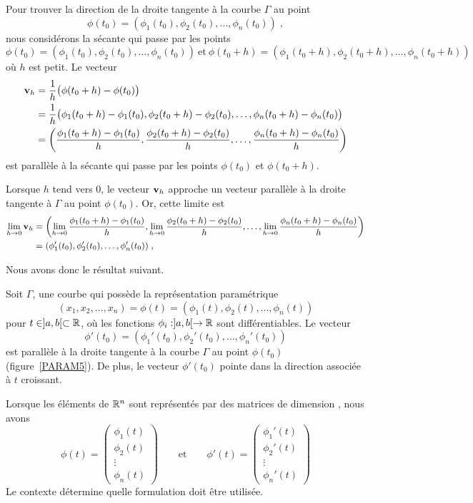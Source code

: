 {Pour trouver la direction de la droite tangente à la courbe $\Gamma$
au point
\[
\phi(t_0) = (\phi_1(t_0), \phi_2(t_0), \ldots, \phi_n(t_0)) \; ,
\]
nous considérons la sécante qui passe par les points
\[
\phi(t_0) = (\phi_1(t_0), \phi_2(t_0), \ldots, \phi_n(t_0))
\ \text{et} \ 
\phi(t_0+h) = (\phi_1(t_0+h), \phi_2(t_0+h), \ldots, \phi_n(t_0+h))
\]
où $h$ est petit. Le vecteur
\begin{align*}
\mathbf{v}_h &= \frac{1}{h} \big(\phi(t_0+h)-\phi(t_0)\big) \\
&= \frac{1}{h}\big(\phi_1(t_0+h) - \phi_1(t_0),
\phi_2(t_0+h) - \phi_2(t_0), \ldots , \phi_n(t_0+h)-\phi_n(t_0)\big) \\
&= \left(\displaystyle \frac{\phi_1(t_0+h) - \phi_1(t_0)}{h},
\displaystyle \frac{\phi_2(t_0+h) - \phi_2(t_0)}{h}, \ldots ,
\displaystyle \frac{\phi_n(t_0+h) - \phi_n(t_0)}{h}\right)
\end{align*}
est parallèle à la sécante qui passe par les points $\phi(t_0)$ et
$\phi(t_0+h)$.

Lorsque $h$ tend vers $0$, le vecteur $\mathbf{v}_h$ approche un vecteur
parallèle à la droite tangente à $\Gamma$ au point $\phi(t_0)$.  Or,
cette limite est
\begin{align*}
\lim_{h\rightarrow 0}\mathbf{v}_h &=
\left(\displaystyle \lim_{h\rightarrow 0}\frac{\phi_1(t_0+h) - \phi_1(t_0)}{h},
\displaystyle \lim_{h\rightarrow 0}\frac{\phi_2(t_0+h) - \phi_2(t_0)}{h},
 \ldots ,
\displaystyle \lim_{h\rightarrow 0}\frac{\phi_n(t_0+h)
- \phi_n(t_0)}{h}\right) \\
&= (\phi_1'(t_0), \phi_2'(t_0), \ldots, \phi_n'(t_0)) \; ,
\end{align*}

Nous avons donc le résultat suivant.

\begin{prop}
Soit $\Gamma$, une courbe qui possède la représentation paramétrique
\[
(x_1,x_2, \ldots, x_n) =
\phi(t) = (\phi_1(t), \phi_2(t), \ldots, \phi_n(t))
\]
pour $t \in ]a,b[ \subset \mathbb{R}$, où les fonctions
$\phi_i:]a,b[ \rightarrow \mathbb{R}$ sont différentiables.
Le vecteur
\[
\phi'(t_0) = (\phi_1'(t_0), \phi_2'(t_0), \ldots, \phi_n'(t_0))
\]
est parallèle à la droite tangente à la courbe $\Gamma$ au point
$\phi(t_0)$ (figure~\ref{PARAM5}).  De plus, le vecteur $\phi'(t_0)$
pointe dans la direction associée à $t$ croissant.

Lorsque les éléments de $\mathbb{R}^n$ sont représentés par des matrices de
dimension \nm{n}{1}, nous avons
\[
\phi(t) = \begin{pmatrix}
  \phi_1(t) \\ \phi_2(t) \\ \vdots \\ \phi_n(t)
\end{pmatrix}
\qquad \text{et} \qquad
\phi'(t) = \begin{pmatrix}
  \phi_1'(t) \\ \phi_2'(t) \\ \vdots \\ \phi_n'(t)
\end{pmatrix}
\]
Le contexte détermine quelle formulation doit être utilisée.
\end{prop}

}

